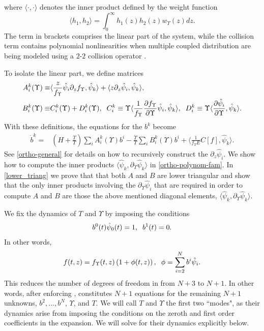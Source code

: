 where $\langle\cdot,\cdot\rangle$ denotes the inner product defined by the weight function 
\begin{equation}
\langle h_1,h_2\rangle=\int_0^\infty h_1(z)h_2(z)w_\Upsilon(z)dz.
\end{equation}
  The term in brackets comprises the linear part of the system, while the collision term contains polynomial nonlinearities when multiple coupled distribution are being modeled using a $2$-$2$ collision operator .  

To isolate the linear part, we define matrices
\begin{align}\label{A_B_matrices}
A^k_i(\Upsilon)\equiv&\langle\frac{z}{f_\Upsilon }\hat\psi_i\partial_zf_\Upsilon ,\hat\psi_k\rangle+\langle z\partial_z \hat\psi_i,\hat\psi_k\rangle,\\
B^k_i(\Upsilon)\equiv& C_i^k(\Upsilon)+D_i^k(\Upsilon),\hspace{2mm} C_i^k\equiv\Upsilon\langle\frac{1}{f_\Upsilon }\frac{\partial f_\Upsilon }{\partial\Upsilon}\hat\psi_i,\hat\psi_k\rangle,\hspace{2mm} D_i^k\equiv\Upsilon\langle\frac{\partial\hat{\psi}_i}{\partial \Upsilon},\hat\psi_k\rangle. 
\end{align}
 With these definitions, the equations for the $b^k$ become
\begin{align}\label{b_eq}
\dot b^k=& \left(H+\frac{\dot{T}}{T}\right)\sum_i A_i^k(\Upsilon)b^i-\frac{\dot{\Upsilon}}{\Upsilon}\sum_i B_i^k(\Upsilon)b^i+\langle\frac{1}{f_\Upsilon E}C[f],\hat\psi_k\rangle.
\end{align}
 See \ref{ortho-general} for details on how to recursively construct the $\partial_z\hat\psi_i$. We show how to compute the inner products $\langle\hat\psi_k,\partial_{\Upsilon}\hat\psi_k\rangle$ in  \ref{ortho-polynom-fam}. In \ref{lower_triang} we prove that that both $A$ and $B$ are lower triangular and show that the only inner products involving the $\partial_\Upsilon\hat{\psi}_i$ that are required in order to compute $A$ and $B$ are those the above mentioned diagonal elements, $\langle\hat\psi_k,\partial_{\Upsilon}\hat\psi_k\rangle$.


We fix the dynamics of $T$ and $\Upsilon$ by imposing the conditions
\begin{equation}\label{b_ics}
b^0(t)\hat\psi_0(t)=1,\hspace{2mm}b^1(t)=0.
\end{equation}
In other words,
\begin{equation}
f(t,z)=f_\Upsilon (t,z)\left(1+\phi(t,z)\right),\hspace{2mm} \phi=\sum_{i=2}^N b^i\hat\psi_i.
\end{equation}
This reduces the number of degrees of freedom in  from $N+3$ to $N+1$.  In other words, after enforcing ,  constitutes $N+1$ equations for the remaining $N+1$ unknowns, $b^2,...,b^N$, $\Upsilon$, and $T$.  We will call $T$ and $\Upsilon$ the first two ``modes", as their dynamics arise from imposing the conditions  on the zeroth and first order coefficients in the expansion. We will solve for their dynamics explicitly below.


